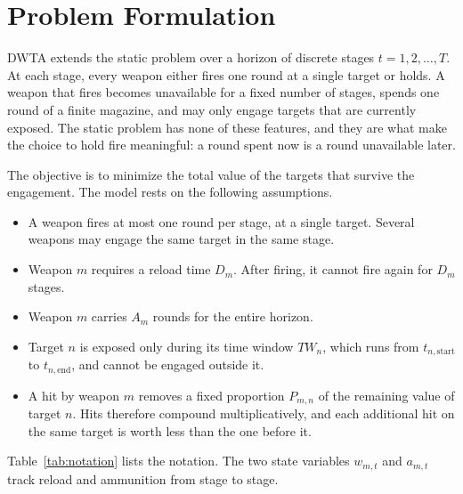 \section{Problem Formulation}
\label{sec:problem}

DWTA extends the static problem over a horizon of discrete stages
$t = 1, 2, \ldots, T$. At each stage, every weapon either fires one round at a
single target or holds. A weapon that fires becomes unavailable for a fixed
number of stages, spends one round of a finite magazine, and may only engage
targets that are currently exposed. The
static problem has none of these features, and they are what make the choice
to hold fire meaningful: a round spent now is a round unavailable later.

The objective is to minimize the total value of the targets that survive the
engagement. The model rests on the following assumptions.

\begin{itemize}
    \item A weapon fires at most one round per stage, at a single target.
    Several weapons may engage the same target in the same stage.
    \item Weapon $m$ requires a reload time $D_m$. After firing, it cannot
    fire again for $D_m$ stages.
    \item Weapon $m$ carries $A_m$ rounds for the entire horizon.
    \item Target $n$ is exposed only during its time window $TW_n$, which runs
    from $t_{n,\text{start}}$ to $t_{n,\text{end}}$, and cannot be engaged
    outside it.
    \item A hit by weapon $m$ removes a fixed proportion $P_{m,n}$ of the
    remaining value of target $n$. Hits therefore compound multiplicatively,
    and each additional hit on the same target is worth less than the one
    before it.
\end{itemize}

Table~\ref{tab:notation} lists the notation. The two state variables
$w_{m,t}$ and $a_{m,t}$ track reload and ammunition from stage to stage.

